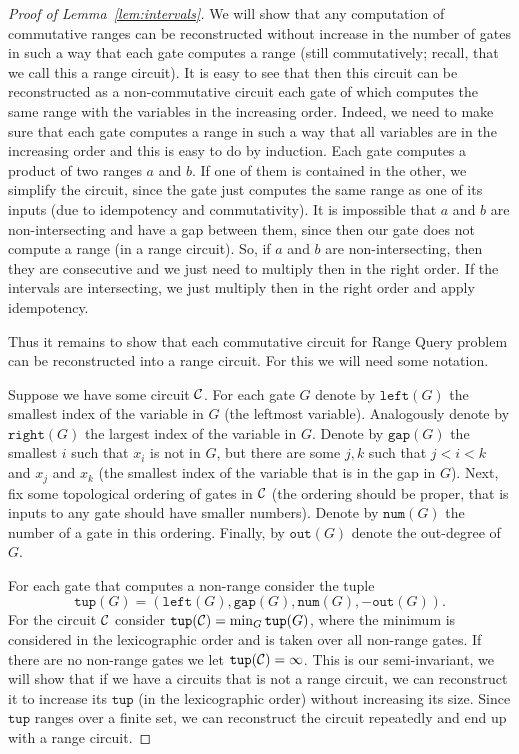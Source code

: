 \documentclass[11pt,letterpaper]{article}
\newcommand{\lef}{\texttt{left}}
\newcommand{\righ}{\texttt{right}}
\newcommand{\gap}{\texttt{gap}}
\newcommand{\num}{\texttt{num}}
\newcommand{\out}{\texttt{out}}
\newcommand{\tup}{\texttt{tup}}
\begin{document}
\begin{proof}[Proof of Lemma~\ref{lem:intervals}]
We will show that any computation of commutative ranges can be reconstructed without increase in the number of gates in such a way that each gate computes a range (still commutatively; recall, that we call this a range circuit). It is easy to see that then this circuit can be reconstructed as a non-commutative circuit each gate of which computes the same range with the variables in the increasing order. Indeed, we need to make sure that each gate computes a range in such a way that all variables are in the increasing order and this is easy to do by induction. Each gate computes a product of two ranges $a$ and $b$. If one of them is contained in the other, we simplify the circuit, since the gate just computes the same range as one of its inputs (due to idempotency and commutativity). It is impossible that $a$ and $b$ are non-intersecting and have a gap between them, since then our gate does not compute a range (in a range circuit). So, if $a$ and  $b$ are non-intersecting, then they are consecutive and we just need to multiply then in the right order. If the intervals are intersecting, we just multiply then in the right order and apply idempotency.

Thus it remains to show that each commutative circuit for Range Query problem can be reconstructed into a range circuit. For this we will need some notation.

Suppose we have some circuit ${\cal C}$. For each gate $G$ denote by $\lef(G)$ the smallest index of the variable in $G$ (the leftmost variable). Analogously denote by $\righ(G)$ the largest index of the variable in $G$. Denote by $\gap(G)$ the smallest $i$ such that $x_i$ is not in $G$, but there are some $j,k$ such that $j<i<k$ and $x_j$ and $x_k$ (the smallest index of the variable that is in the gap in $G$).
Next, fix some topological ordering of gates in ${\cal C}$ (the ordering should be proper, that is inputs to any gate should have smaller numbers). Denote by $\num(G)$ the number of a gate in this ordering. Finally, by $\out(G)$ denote the out-degree of $G$.

For each gate that computes a non-range consider the tuple
$$
\tup(G)=(\lef(G),\gap(G),\num(G),-\out(G)).
$$ For the circuit ${\cal C}$ consider $\tup({\cal C}) = \min_G \tup(G)$, where the minimum is considered in the lexicographic order and is taken over all non-range gates. If there are no non-range gates we let $\tup({\cal C})=\infty$. This is our semi-invariant, we will show that if we have a circuits that is not a range circuit, we can reconstruct it to increase  its $\tup$ (in the lexicographic order) without increasing its size. Since $\tup$ ranges over a finite set, we can reconstruct the circuit repeatedly and end up with a range circuit.


\end{proof}
\end{document}
